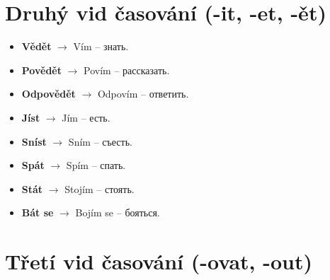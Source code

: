 \documentclass[12pt]{book}
\begin{document}
\section{Druhý vid časování (-it, -et, -ět)}
\begin{itemize}
    \item \textbf{Vědět} $\rightarrow$ Vím -- \textrussian{знать}.
    \item \textbf{Povědět} $\rightarrow$ Povím -- \textrussian{рассказать}.
    \item \textbf{Odpovědět} $\rightarrow$ Odpovím -- \textrussian{ответить}.
    \item \textbf{Jíst} $\rightarrow$ Jím -- \textrussian{есть}.
    \item \textbf{Sníst} $\rightarrow$ Sním -- \textrussian{съесть}.
    \item \textbf{Spát} $\rightarrow$ Spím -- \textrussian{спать}.
    \item \textbf{Stát} $\rightarrow$ Stojím -- \textrussian{стоять}.
    \item \textbf{Bát se} $\rightarrow$ Bojím se -- \textrussian{бояться}.
\end{itemize}

\section{Třetí vid časování (-ovat, -out)}
\end{document}
